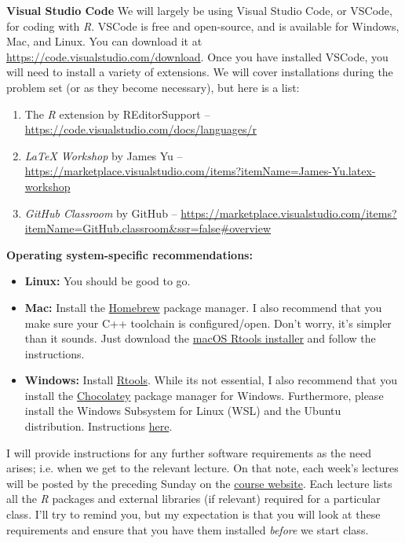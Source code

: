 \documentclass[11pt]{article}
\begin{document}
\textbf{Visual Studio Code}
We will largely be using Visual Studio Code, or VSCode, for coding with \textit{R}. VSCode is free and open-source, and is available for Windows, Mac, and Linux. You can download it at \url{https://code.visualstudio.com/download}. Once you have installed VSCode, you will need to install a variety of extensions. We will cover installations during the problem set (or as they become necessary), but here is a list:

\begin{enumerate}
  \item The \textit{R} extension by REditorSupport -- \url{https://code.visualstudio.com/docs/languages/r}
  \item \textit{LaTeX Workshop} by James Yu -- \url{https://marketplace.visualstudio.com/items?itemName=James-Yu.latex-workshop}
  \item \textit{GitHub Classroom} by GitHub -- \url{https://marketplace.visualstudio.com/items?itemName=GitHub.classroom&ssr=false#overview}
\end{enumerate}

\textbf{Operating system-specific recommendations:}

\begin{itemize}
	\item \textbf{Linux:} You should be good to go. 
	\item \textbf{Mac:} Install the \href{https://brew.sh/}{Homebrew} package manager. I also recommend that you make sure your C++ toolchain is configured/open. Don't worry, it's simpler than it sounds. Just download the \href{https://github.com/rmacoslib/r-macos-rtools#installer-package-for-macos-r-toolchain-}{macOS Rtools installer} and follow the instructions.
	\item \textbf{Windows:} Install \href{https://cran.r-project.org/bin/windows/Rtools/}{Rtools}. While its not essential, I also recommend that you install the \href{https://chocolatey.org/}{Chocolatey} package manager for Windows. Furthermore, please install the Windows Subsystem for Linux (WSL) and the Ubuntu distribution. Instructions \href{https://docs.microsoft.com/en-us/windows/wsl/install-win10}{here}.
\end{itemize}

I will provide instructions for any further software requirements as the need arises; i.e. when we get to the relevant lecture. On that note, each week's lectures will be posted by the preceding Sunday on the \href{https://github.com/ECON368-fall2023-big-data-and-economics}{course website}. Each lecture lists all the \textit{R} packages and external libraries (if relevant) required for a particular class. I'll try to remind you, but my expectation is that you will look at these requirements and ensure that you have them installed \textit{before} we start class. 
\end{document}

